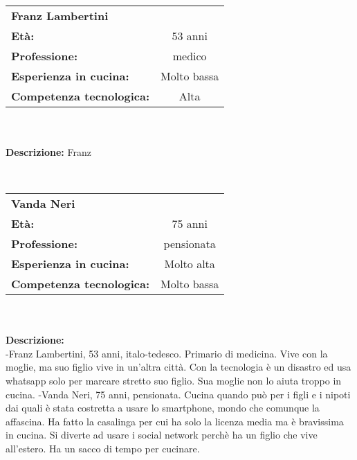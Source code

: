 \hrulefill\\
\begin{tabular}{l | c}
	\textbf{Franz Lambertini} & \\
	\textbf{Età:} & 53 anni\\
	\textbf{Professione:} & medico\\
	\textbf{Esperienza in cucina:} & Molto bassa\\
	\textbf{Competenza tecnologica:} & Alta\\
\end{tabular}\\\\
	\textbf{Descrizione:}
	Franz

\hrulefill\\
\begin{tabular}{l | c}
	\textbf{Vanda Neri} & \\
	\textbf{Età:} & 75 anni\\
	\textbf{Professione:} & pensionata\\
	\textbf{Esperienza in cucina:} & Molto alta\\
	\textbf{Competenza tecnologica:} & Molto bassa\\
\end{tabular}\\\\
	\textbf{Descrizione:}\\

-Franz Lambertini, 53 anni, italo-tedesco. Primario di medicina. Vive con la moglie, ma suo figlio vive in un’altra città. Con la tecnologia è un disastro ed usa whatsapp solo per marcare stretto suo figlio. Sua moglie non lo aiuta troppo in cucina. 
-Vanda Neri, 75 anni, pensionata. Cucina quando può per i figli e i nipoti dai quali è stata costretta a usare lo smartphone, mondo che comunque la affascina. Ha fatto la casalinga per cui ha solo la licenza media ma è bravissima in cucina. Si diverte ad usare i social network perchè ha un figlio che vive all’estero. Ha un sacco di tempo per cucinare.

